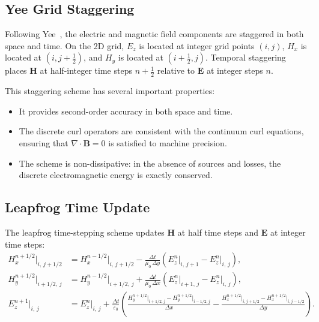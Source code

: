 \documentclass[11pt,a4paper]{report}
\newcommand{\dt}{\Delta t}
\newcommand{\dx}{\Delta x}
\newcommand{\dy}{\Delta y}
\begin{document}
\subsection{Yee Grid Staggering}

Following Yee~\cite{Yee1966}, the electric and magnetic field components are staggered in both space and time.  On the 2D grid, $E_z$ is located at integer grid points $(i,j)$, $H_x$ is located at $(i, j+\frac{1}{2})$, and $H_y$ is located at $(i+\frac{1}{2}, j)$.  Temporal staggering places $\mathbf{H}$ at half-integer time steps $n + \frac{1}{2}$ relative to $\mathbf{E}$ at integer steps $n$.

This staggering scheme has several important properties:
\begin{itemize}
  \item It provides second-order accuracy in both space and time.
  \item The discrete curl operators are consistent with the continuum curl equations, ensuring that $\nabla \cdot \mathbf{B} = 0$ is satisfied to machine precision.
  \item The scheme is non-dissipative: in the absence of sources and losses, the discrete electromagnetic energy is exactly conserved.
\end{itemize}

\subsection{Leapfrog Time Update}

The leapfrog time-stepping scheme updates $\mathbf{H}$ at half time steps and $\mathbf{E}$ at integer time steps:
\begin{align}
  H_x^{n+1/2}\!\big|_{i,\,j+1/2} &= H_x^{n-1/2}\!\big|_{i,\,j+1/2}
    - \frac{\dt}{\mu_0\,\dy}\!\left(
      E_z^n\big|_{i,\,j+1} - E_z^n\big|_{i,\,j}\right),
    \label{eq:fdtd-hx-update} \\[4pt]
  H_y^{n+1/2}\!\big|_{i+1/2,\,j} &= H_y^{n-1/2}\!\big|_{i+1/2,\,j}
    + \frac{\dt}{\mu_0\,\dx}\!\left(
      E_z^n\big|_{i+1,\,j} - E_z^n\big|_{i,\,j}\right),
    \label{eq:fdtd-hy-update} \\[4pt]
  E_z^{n+1}\!\big|_{i,\,j} &= E_z^n\big|_{i,\,j}
    + \frac{\dt}{\varepsilon_0}\!\left(
      \frac{H_y^{n+1/2}\big|_{i+1/2,j} - H_y^{n+1/2}\big|_{i-1/2,j}}{\dx}
    - \frac{H_x^{n+1/2}\big|_{i,j+1/2} - H_x^{n+1/2}\big|_{i,j-1/2}}{\dy}
    \right).
    \label{eq:fdtd-ez-update}
\end{align}
\end{document}
